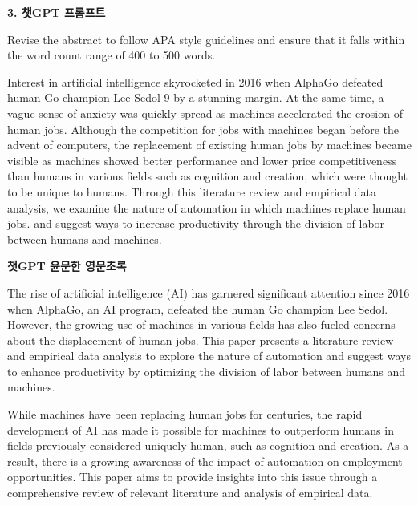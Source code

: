 \documentclass[
  letterpaper,
]{book}
\begin{document}
\begin{tcolorbox}[enhanced jigsaw, opacityback=0, bottomrule=.15mm, breakable, arc=.35mm, rightrule=.15mm, leftrule=.75mm, toprule=.15mm, left=2mm, colframe=quarto-callout-tip-color-frame, colback=white]
\begin{minipage}[t]{5.5mm}
\textcolor{quarto-callout-tip-color}{\faLightbulb}
\end{minipage}%
\begin{minipage}[t]{\textwidth - 5.5mm}

\textbf{3. 챗GPT 프롬프트}\vspace{2mm}

Revise the abstract to follow APA style guidelines and ensure that it
falls within the word count range of 400 to 500 words.

Interest in artificial intelligence skyrocketed in 2016 when AlphaGo
defeated human Go champion Lee Sedol 9 by a stunning margin. At the same
time, a vague sense of anxiety was quickly spread as machines
accelerated the erosion of human jobs. Although the competition for jobs
with machines began before the advent of computers, the replacement of
existing human jobs by machines became visible as machines showed better
performance and lower price competitiveness than humans in various
fields such as cognition and creation, which were thought to be unique
to humans. Through this literature review and empirical data analysis,
we examine the nature of automation in which machines replace human
jobs. and suggest ways to increase productivity through the division of
labor between humans and machines.

\end{minipage}%
\end{tcolorbox}

\textbf{챗GPT 윤문한 영문초록}

The rise of artificial intelligence (AI) has garnered significant
attention since 2016 when AlphaGo, an AI program, defeated the human Go
champion Lee Sedol. However, the growing use of machines in various
fields has also fueled concerns about the displacement of human jobs.
This paper presents a literature review and empirical data analysis to
explore the nature of automation and suggest ways to enhance
productivity by optimizing the division of labor between humans and
machines.

While machines have been replacing human jobs for centuries, the rapid
development of AI has made it possible for machines to outperform humans
in fields previously considered uniquely human, such as cognition and
creation. As a result, there is a growing awareness of the impact of
automation on employment opportunities. This paper aims to provide
insights into this issue through a comprehensive review of relevant
literature and analysis of empirical data.
\end{document}
